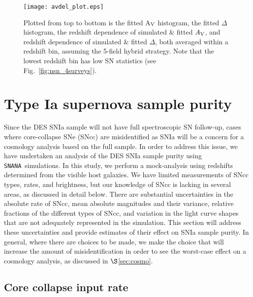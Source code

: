 \documentclass[preprint2]{aastex}    %
\newcommand\av{$A_{\rm V}$}
\newcommand{\snana}{{\tt SNANA}}
\begin{document}
\begin{figure}
\centerline{\texttt{[image: avdel\_plot.eps]}}
\caption{Plotted from top to bottom is the fitted A$_{\rm V}$ 
histogram, the fitted $\Delta$ histogram, the redshift dependence of simulated \& fitted \av, 
and redshift dependence of simulated \& fitted $\Delta$, both averaged within a redshift bin,
assuming the 5-field hybrid strategy. Note that the lowest redshift bin has low SN statistics 
(see Fig.~\ref{fig:nsn_4surveys}).}
\label{fig:avdel}
\end{figure}

\section{Type Ia supernova sample purity}\label{sec:misid}

Since the DES SNIa sample will not have full spectroscopic SN follow-up, cases
where core-collapse SNe (SNcc) are misidentified as SNIa 
will be a concern for a cosmology analysis based on the full sample. 
In order to address this issue, we have undertaken an 
analysis of the DES SNIa sample purity using \snana\ simulations. In this study,
we perform a mock-analysis using redshifts determined from the visible host galaxies.
We have limited measurements of SNcc types, rates, and brightness, but our knowledge of SNcc 
is lacking in several areas, as discussed in detail below.  There are substantial 
uncertainties in the absolute rate of SNcc,  
mean absolute magnitudes and their variance, relative fractions of the 
different types of SNcc, and variation in the light curve shapes 
that are not adequately represented in the simulation.
This section will address these uncertainties and provide estimates of their effect on 
SNIa sample purity.  In general, where there are choices to be made, we
make the choice that will increase the amount of misidentification in order
to see the worst-case effect on a cosmology analysis, as discussed in 
$\S$\ref{sec:cosmo}.

\subsection{Core collapse input rate}\label{sec:ccrate}
\end{document}
